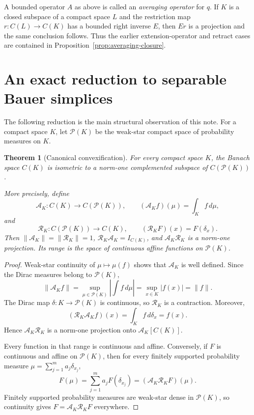 \documentclass[11pt]{article}
\newtheorem{theorem}{Theorem}[section]
\theoremstyle{definition}
\theoremstyle{remark}
\newcommand{\C}{C}
\newcommand{\Pp}{\mathcal P}
\newcommand{\Id}{I}
\begin{document}
A bounded operator $A$ as above is called an \emph{averaging operator} for
$q$.  If $K$ is a closed subspace of a compact space $L$ and the restriction
map $r:\C(L)\to\C(K)$ has a bounded right inverse $E$, then $Er$ is a
projection and the same conclusion follows.  Thus the earlier
extension-operator and retract cases are contained in
Proposition~\ref{prop:averaging-closure}.

\section{An exact reduction to separable Bauer simplices}

The following reduction is the main structural observation of this note.
For a compact space $K$, let $\Pp(K)$ be the weak-star compact space of
probability measures on $K$.

\begin{theorem}[Canonical convexification]\label{thm:convexification}
For every compact space $K$, the Banach space $\C(K)$ is isometric to a
norm-one complemented subspace of $\C(\Pp(K))$.

More precisely, define
\[
 \mathcal A_K:\C(K)\longrightarrow\C(\Pp(K)),
 \qquad (\mathcal A_Kf)(\mu)=\int_K f\,d\mu,
\]
and
\[
 \mathcal R_K:\C(\Pp(K))\longrightarrow\C(K),
 \qquad (\mathcal R_KF)(x)=F(\delta_x).
\]
Then $\|\mathcal A_K\|=\|\mathcal R_K\|=1$,
$\mathcal R_K\mathcal A_K=\Id_{\C(K)}$, and
$\mathcal A_K\mathcal R_K$ is a norm-one projection.  Its range is the
space of continuous affine functions on $\Pp(K)$.
\end{theorem}

\begin{proof}
Weak-star continuity of $\mu\mapsto\mu(f)$ shows that $\mathcal A_K$ is
well defined.  Since the Dirac measures belong to $\Pp(K)$,
\[
 \|\mathcal A_Kf\|
 =\sup_{\mu\in\Pp(K)}\left|\int f\,d\mu\right|
 =\sup_{x\in K}|f(x)|=\|f\|.
\]
The Dirac map $\delta:K\to\Pp(K)$ is continuous, so $\mathcal R_K$ is a
contraction.  Moreover,
\[
 (\mathcal R_K\mathcal A_Kf)(x)
 =\int_K f\,d\delta_x=f(x).
\]
Hence $\mathcal A_K\mathcal R_K$ is a norm-one projection onto
$\mathcal A_K[\C(K)]$.

Every function in that range is continuous and affine.  Conversely, if
$F$ is continuous and affine on $\Pp(K)$, then for every finitely supported
probability measure $\mu=\sum_{j=1}^m a_j\delta_{x_j}$,
\[
       F(\mu)=\sum_{j=1}^m a_jF(\delta_{x_j})
             =(\mathcal A_K\mathcal R_KF)(\mu).
\]
Finitely supported probability measures are weak-star dense in $\Pp(K)$,
so continuity gives $F=\mathcal A_K\mathcal R_KF$ everywhere.
\end{proof}
\end{document}
